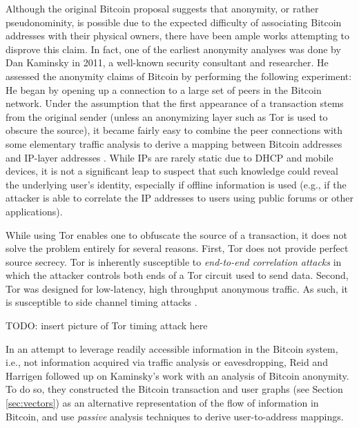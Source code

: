 Although the original Bitcoin proposal suggests that anonymity, or rather pseudonominity, is possible due to the expected difficulty of associating Bitcoin addresses with their physical owners, there have been ample works attempting to disprove this claim. In fact, one of the earliest anonymity analyses was done by Dan Kaminsky in 2011, a well-known security consultant and researcher. He assessed the anonymity claims of Bitcoin by performing the following experiment: He began by opening up a connection to a large set of peers in the Bitcoin network. Under the assumption that the first appearance of a transaction stems from the original sender (unless an anonymizing layer such as Tor is used to obscure the source), it became fairly easy to combine the peer connections with some elementary traffic analysis to derive a mapping between Bitcoin addresses and IP-layer addresses \cite{kaminsky}. While IPs are rarely static due to DHCP and mobile devices, it is not a significant leap to suspect that such knowledge could reveal the underlying user's identity, especially if offline information is used (e.g., if the attacker is able to correlate the IP addresses to users using public forums or other applications). 

While using Tor enables one to obfuscate the source of a transaction, it does not solve the problem entirely for several reasons. First, Tor does not provide perfect source secrecy. Tor is inherently susceptible to \emph{end-to-end correlation attacks} in which the attacker controls both ends of a Tor circuit used to send data. Second, Tor was designed for low-latency, high throughput anonymous traffic. As such, it is susceptible to side channel timing attacks \cite{bitcoin-tor-wiki}.

TODO: insert picture of Tor timing attack here 

In an attempt to leverage readily accessible information in the Bitcoin system, i.e., not information acquired via traffic analysis or eavesdropping, Reid and Harrigen \cite{ReidHarrigan13} followed up on Kaminsky's work with an analysis of Bitcoin anonymity. To do so, they constructed the Bitcoin transaction and user graphs (see Section \ref{sec:vectors}) as an alternative representation of the flow of information in Bitcoin, and use \emph{passive} analysis techniques to derive user-to-address mappings. 



